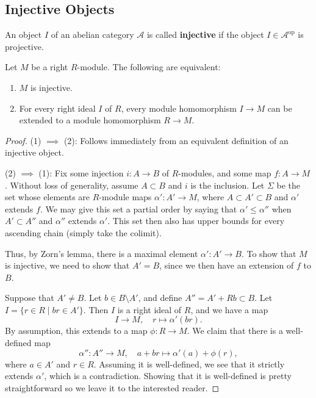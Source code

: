 \subsection{Injective Objects} %
\label{sub:Injective Objects}
\begin{defintion}
  An object $ I $ of an abelian category $ \mathcal{A} $ is called \textbf{injective} if the object $ I \in \mathcal{A}^{\text{op}} $ is projective.
\end{defintion}

\begin{theorem}
  Let $ M $ be a right $ R $-module. The following are equivalent:
  \begin{enumerate}
    \item $ M $ is injective.
    \item For every right ideal $ I $ of $ R $, every module homomorphism $ I \to M $ can be extended to a module homomorphism $ R \to M $.
  \end{enumerate}
\end{theorem}
\begin{proof}
  (1) $ \implies $ (2): Follows immediately from an equivalent definition of an injective object.

  (2) $ \implies $ (1): Fix some injection $ i: A \to B $ of $ R $-modules, and some map $ f: A \to M $. Without loss of generality, assume $ A \subset B $ and $ i $ is the inclusion. Let $ \Sigma $ be the set whose elements are $ R $-module maps $ \alpha': A' \to M $, where $ A \subset A' \subset B $ and $ \alpha' $ extends $ f $. We may give this set a partial order by saying that $ \alpha' \leq \alpha'' $ when $ A' \subset A'' $ and $ \alpha'' $ extends $ \alpha' $. This set then also has upper bounds for every ascending chain (simply take the colimit).

  Thus, by Zorn's lemma, there is a maximal element $ \alpha': A' \to B $. To show that $ M $ is injective, we need to show that $ A' = B $, since we then have an extension of $ f $ to $ B $.

  Suppose that $ A' \neq B $. Let $ b \in B\setminus A' $, and define $ A''=A' + Rb \subset B $. Let $ I = \{r \in R \mid br \in A'\} $. Then $ I $ is a right ideal of $ R $, and we have a map
  \begin{equation*}
  I \to M, \quad r \mapsto \alpha'(br)
  .\end{equation*}
  By assumption, this extends to a map $ \phi: R \to M $. We claim that there is a well-defined map
  \begin{equation*}
  \alpha'': A'' \to M, \quad a+br \mapsto \alpha'(a) + \phi(r),
  \end{equation*}
  where $ a \in A' $ and $ r \in R $. Assuming it is well-defined, we see that it strictly extends $ \alpha' $, which is a contradiction. Showing that it is well-defined is pretty straightforward so we leave it to the interested reader.
\end{proof}


